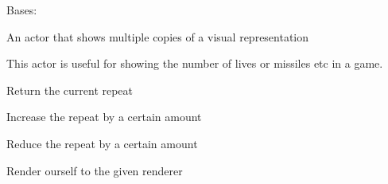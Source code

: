 \documentclass[letterpaper,10pt,english]{sphinxmanual}
\begin{document}

\begin{fulllineitems}
\label{blocks:serge.blocks.actors.RepeatedVisualActor}
Bases: {\hyperref[actor:serge.actor.Actor]{}}

An actor that shows multiple copies of a visual representation

This actor is useful for showing the number of lives or missiles
etc in a game.

\begin{fulllineitems}
\label{blocks:serge.blocks.actors.RepeatedVisualActor.getRepeat}
Return the current repeat

\end{fulllineitems}


\begin{fulllineitems}
\label{blocks:serge.blocks.actors.RepeatedVisualActor.increaseRepeat}
Increase the repeat by a certain amount

\end{fulllineitems}


\begin{fulllineitems}
\label{blocks:serge.blocks.actors.RepeatedVisualActor.reduceRepeat}
Reduce the repeat by a certain amount

\end{fulllineitems}


\begin{fulllineitems}
\label{blocks:serge.blocks.actors.RepeatedVisualActor.renderTo}
Render ourself to the given renderer


\end{fulllineitems}
\end{fulllineitems}
\end{document}

